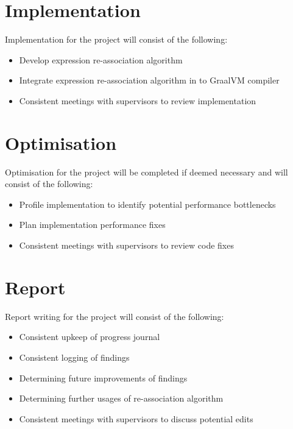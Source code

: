 \documentclass[12pt,openany,a4paper]{book}
\begin{document}
\section{Implementation}
\label{implementation}

Implementation for the project will consist of the following:

\begin{itemize}
\item Develop expression re-association algorithm
\item Integrate expression re-association algorithm in to GraalVM compiler
\item Consistent meetings with supervisors to review implementation
\end{itemize}

\section{Optimisation}
\label{optimisation}

Optimisation for the project will be completed if deemed necessary and will
consist of the following:

\begin{itemize}
\item Profile implementation to identify potential performance bottlenecks
\item Plan implementation performance fixes
\item Consistent meetings with supervisors to review code fixes
\end{itemize}

\section{Report}
\label{report}

Report writing for the project will consist of the following:

\begin{itemize}
\item Consistent upkeep of progress journal
\item Consistent logging of findings
\item Determining future improvements of findings
\item Determining further usages of re-association algorithm
\item Consistent meetings with supervisors to discuss potential edits
\end{itemize}
\end{document}
